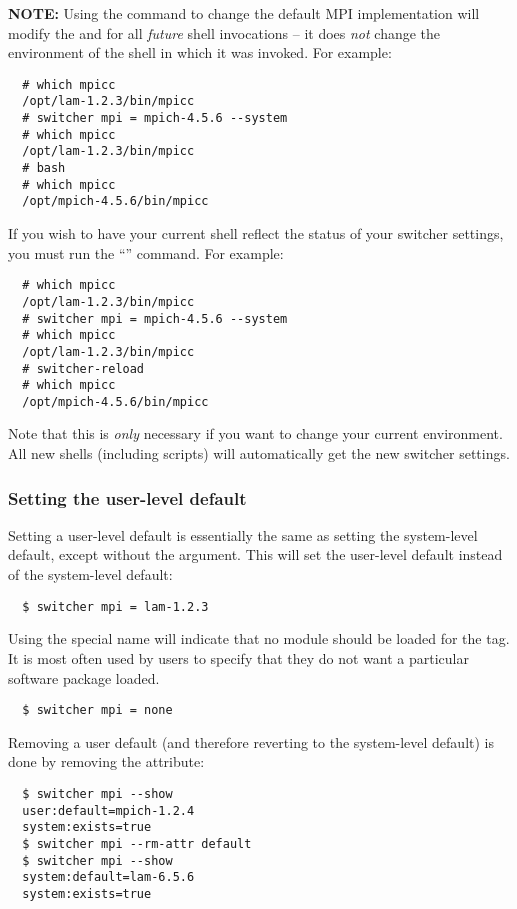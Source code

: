 {\bf NOTE:} Using the  command to change the default MPI
implementation will modify the  and  for all
{\em future} shell invocations -- it does {\em not} change the
environment of the shell in which it was invoked.  For example:

\begin{verbatim}
  # which mpicc
  /opt/lam-1.2.3/bin/mpicc
  # switcher mpi = mpich-4.5.6 --system
  # which mpicc
  /opt/lam-1.2.3/bin/mpicc
  # bash
  # which mpicc
  /opt/mpich-4.5.6/bin/mpicc
\end{verbatim}

If you wish to have your current shell reflect the status of your
switcher settings, you must run the ``''
command.  For example:

\begin{verbatim}
  # which mpicc
  /opt/lam-1.2.3/bin/mpicc
  # switcher mpi = mpich-4.5.6 --system
  # which mpicc
  /opt/lam-1.2.3/bin/mpicc
  # switcher-reload
  # which mpicc
  /opt/mpich-4.5.6/bin/mpicc
\end{verbatim}

Note that this is {\em only} necessary if you want to change your
current environment.  All new shells (including scripts) will
automatically get the new switcher settings.


\subsubsection{Setting the user-level default}

Setting a user-level default is essentially the same as setting the
system-level default, except without the  argument.
This will set the user-level default instead of the system-level
default:

\begin{verbatim}
  $ switcher mpi = lam-1.2.3
\end{verbatim}


Using the special name  will indicate that no module should
be loaded for the  tag.  It is most often used by users to
specify that they do not want a particular software package loaded.

\begin{verbatim}
  $ switcher mpi = none
\end{verbatim}


Removing a user default (and therefore reverting to the system-level
default) is done by removing the  attribute:

\begin{verbatim}
  $ switcher mpi --show
  user:default=mpich-1.2.4
  system:exists=true
  $ switcher mpi --rm-attr default
  $ switcher mpi --show
  system:default=lam-6.5.6
  system:exists=true
\end{verbatim}

